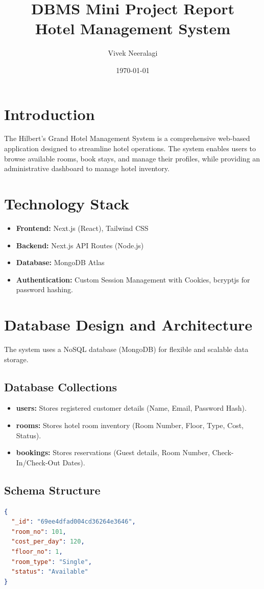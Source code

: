 \documentclass[12pt, a4paper]{article}
\title{\textbf{DBMS Mini Project Report}\\ Hotel Management System}
\author{Vivek Neeralagi}
\date{\today}
\begin{document}
\maketitle
\tableofcontents
\newpage

\section{Introduction}
The Hilbert's Grand Hotel Management System is a comprehensive web-based application designed to streamline hotel operations. The system enables users to browse available rooms, book stays, and manage their profiles, while providing an administrative dashboard to manage hotel inventory.

\section{Technology Stack}
\begin{itemize}
    \item \textbf{Frontend:} Next.js (React), Tailwind CSS
    \item \textbf{Backend:} Next.js API Routes (Node.js)
    \item \textbf{Database:} MongoDB Atlas
    \item \textbf{Authentication:} Custom Session Management with Cookies, bcryptjs for password hashing.
\end{itemize}

\section{Database Design and Architecture}
The system uses a NoSQL database (MongoDB) for flexible and scalable data storage.

\subsection{Database Collections}
\begin{itemize}
    \item \textbf{users:} Stores registered customer details (Name, Email, Password Hash).
    \item \textbf{rooms:} Stores hotel room inventory (Room Number, Floor, Type, Cost, Status).
    \item \textbf{bookings:} Stores reservations (Guest details, Room Number, Check-In/Check-Out Dates).
\end{itemize}

\subsection{Schema Structure}
\begin{lstlisting}[language=json, caption=Sample Room Document]
{
  "_id": "69ee4dfad004cd36264e3646",
  "room_no": 101,
  "cost_per_day": 120,
  "floor_no": 1,
  "room_type": "Single",
  "status": "Available"
}
\end{lstlisting}
\end{document}
